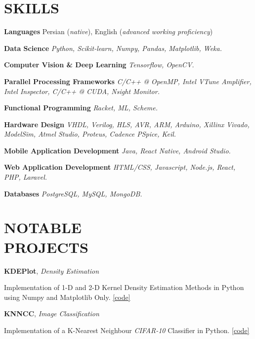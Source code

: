 \documentclass[margin, 10pt]{res} %
\begin{document}
	\section{SKILLS}
	
	\textbf{Languages }
	Persian (\emph{native}), English (\emph{advanced working proficiency})
	
	\textbf{Data Science}
	\textit{Python, Scikit-learn, Numpy, Pandas, Matplotlib, Weka.}
	
	\textbf{Computer Vision \& Deep Learning}
	\textit{Tensorflow, OpenCV.}
	
	\textbf{Parallel Processing Frameworks}
	\textit{C/C++ @ OpenMP, Intel VTune Amplifier, Intel Inspector, C/C++ @ CUDA, Nsight Monitor.}
	
	\textbf{Functional Programming}
	\textit{Racket, ML, Scheme.}

	\textbf{Hardware Design}
	\textit{VHDL, Verilog, HLS, AVR, ARM, Arduino, Xillinx Vivado, ModelSim, Atmel Studio, Proteus, Cadence PSpice, Keil.}
	
	\textbf{Mobile Application Development}
	\textit{Java, React Native, Android Studio.}
	
	
	\textbf{Web Application Development}
	\textit{HTML/CSS, Javascript, Node.js, React, PHP, Laravel.}
	
	\textbf{Databases}
	\textit{PostgreSQL, MySQL, MongoDB.}

\section{NOTABLE \\ PROJECTS}

	\textbf{KDEPlot}, 
\textit{Density Estimation}
\begin{innerlist}
	\item Implementation of 1-D and 2-D Kernel Density Estimation Methods in Python using Numpy and Matplotlib Only.
	\hfill{\UrlFont\href{https://github.com/aligholamee/KDEPlot}{[code]}}
\end{innerlist}

	\textbf{KNNCC}, 
	\textit{Image Classification}
	\begin{innerlist}
		\item Implementation of a K-Nearest Neighbour \textit{CIFAR-10} Classifier in Python.
		\hfill{\UrlFont\href{https://github.com/aligholamee/KNNCC}{[code]}}
	\end{innerlist}
\end{document}
